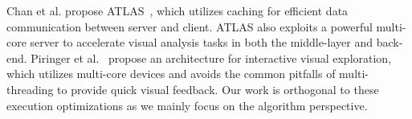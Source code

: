 


Chan et al. propose ATLAS~\cite{chan2008maintaining}, which utilizes caching for efficient data communication between server and client.
ATLAS also exploits a powerful multi-core server to accelerate visual analysis tasks in both the middle-layer and back-end.
Piringer et al.~\cite{piringer2009multi} propose an architecture for interactive visual exploration,
which utilizes multi-core devices and avoids the common pitfalls of multi-threading to provide quick visual feedback.
Our work is orthogonal to these execution optimizations as we mainly focus on the algorithm perspective.

